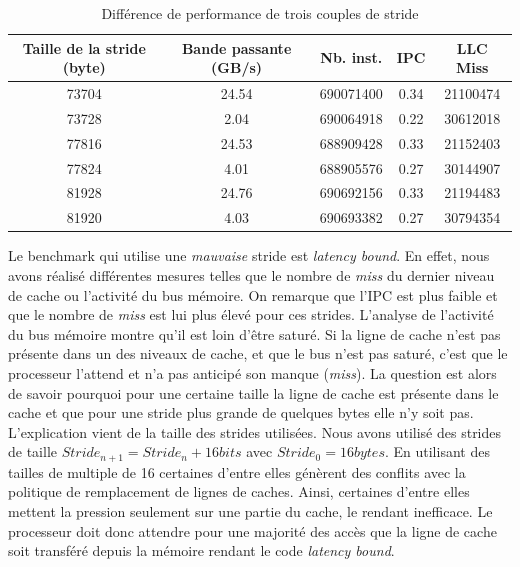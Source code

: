         
        \begin{table}[]
        \centering
        \begin{tabular}{|c|c|c|c|c|}
        \hline
        \rowcolor[HTML]{EFEFEF} 
        Taille de la stride (byte) & Bande passante (GB/s) & Nb. inst. & IPC & LLC Miss \\ \hline
        \rowcolor[HTML]{FFFFC7} 
        73704 & 24.54 & 690071400 & 0.34 & 21100474 \\ \hline
        \rowcolor[HTML]{FFFFC7} 
        73728 & 2.04 & 690064918 & 0.22 & 30612018 \\ \hline
        \rowcolor[HTML]{E8FFFE} 
        77816 & 24.53 & 688909428 & 0.33 & 21152403 \\ \hline
        \rowcolor[HTML]{E8FFFE} 
        77824 & 4.01 & 688905576 & 0.27 & 30144907 \\ \hline
        \rowcolor[HTML]{E6FFE6} 
        81928 & 24.76 & 690692156 & 0.33 & 21194483 \\ \hline
        \rowcolor[HTML]{E6FFE6} 
        81920 & 4.03 & 690693382 & 0.27 & 30794354 \\ \hline
        \end{tabular}%
        \caption{Différence de performance de trois couples de stride}
        \label{tab:dml_bad_strides}
        \end{table}
        
        
        Le benchmark qui utilise une \textit{mauvaise} stride est \textit{latency bound}. En effet, nous avons réalisé différentes mesures telles que le nombre de \textit{miss} du dernier niveau de cache ou l'activité du bus mémoire. On remarque que l'IPC est plus faible et que le nombre de \textit{miss} est lui plus élevé pour ces strides. L'analyse de l'activité du bus mémoire montre qu'il est loin d'être saturé. Si la ligne de cache n'est pas présente dans un des niveaux de cache, et que le bus n'est pas saturé, c'est que le processeur l'attend et n'a pas anticipé son manque (\textit{miss}). La question est alors de savoir pourquoi pour une certaine taille la ligne de cache est présente dans le cache et que pour une stride plus grande de quelques bytes elle n'y soit pas. L'explication vient de la taille des strides utilisées. Nous avons utilisé des strides de taille $ Stride_{n+1} = Stride_n + 16 bits$ avec $Stride_0 = 16 bytes$. En utilisant des tailles de multiple de 16 certaines d'entre elles génèrent des conflits avec la politique de remplacement de lignes de caches. Ainsi, certaines d'entre elles mettent la pression seulement sur une partie du cache, le rendant inefficace. Le processeur doit donc attendre pour une majorité des accès que la ligne de cache soit transféré depuis la mémoire rendant le code \textit{latency bound}.
        

